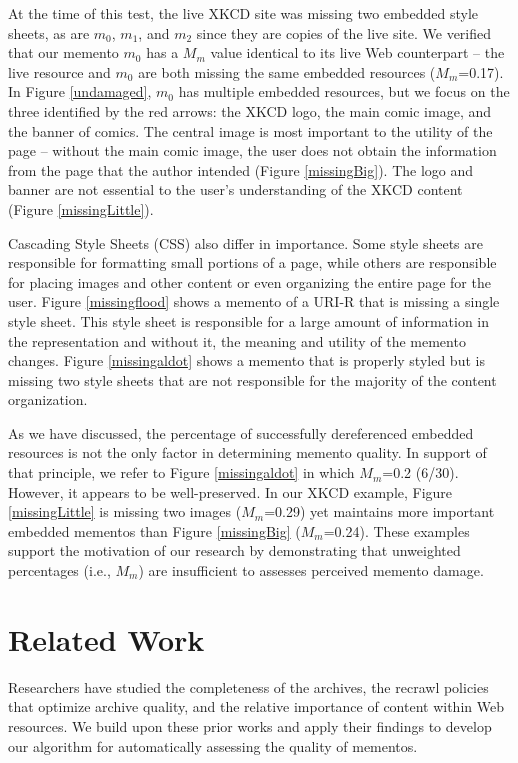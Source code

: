 At the time of this test, the live XKCD site was missing two embedded style sheets, as are $m_0$, $m_1$, and $m_2$ since they are copies of the live site. We verified that our memento $m_0$ has a $M_m$ value identical to its live Web counterpart -- the live resource and $m_0$ are both missing the same embedded resources ($M_m$=0.17). In Figure \ref{undamaged}, $m_0$ has multiple embedded resources, but we focus on the three identified by the red arrows: the XKCD logo, the main comic image, and the banner of comics. The central image is most important to the utility of the page -- without the main comic image, the user does not obtain the information from the page that the author intended (Figure \ref{missingBig}). The logo and banner are not essential to the user's understanding of the XKCD content (Figure \ref{missingLittle}). 

Cascading Style Sheets (CSS) also differ in importance. Some style sheets are responsible for formatting small portions of a page, while others are responsible for placing images and other content or even organizing the entire page for the user. Figure \ref{missingflood} shows a memento of a URI-R that is missing a single style sheet. This style sheet is responsible for a large amount of information in the representation and without it, the meaning and utility of the memento changes. Figure \ref{missingaldot} shows a memento that is properly styled but is missing two style sheets that are not responsible for the majority of the content organization.%

As we have discussed, the percentage of successfully dereferenced embedded resources is not the only factor in determining memento quality. In support of that principle, we refer to Figure \ref{missingaldot} in which $M_m$=0.2 (6/30). However, it appears to be well-preserved. In our XKCD example, Figure \ref{missingLittle} is missing two images ($M_m$=0.29) yet maintains more important embedded mementos than Figure \ref{missingBig} ($M_m$=0.24). These examples support the motivation of our research by demonstrating that unweighted percentages (i.e., $M_m$) are insufficient to assesses perceived memento damage.


\section{Related Work}
\label{priorwork}
Researchers have studied the completeness of the archives, the recrawl policies that optimize archive quality, and the relative importance of content within Web resources. We build upon these prior works and apply their findings to develop our algorithm for automatically assessing the quality of mementos.

